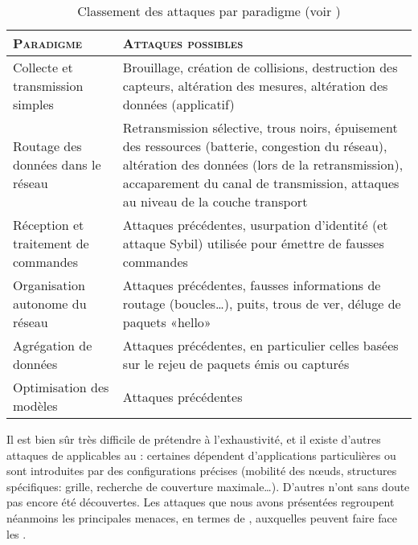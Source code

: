 \begin{table}[!ht]
    \caption{Classement des attaques par paradigme (voir )}\label{ea:tab:paradigm}
    \centering
    \medskip
    \begin{small}
        \begin{tabu}{X[1,l,m]|X[2,j,m]}
            \toprule
            \textsc{Paradigme} & \textsc{Attaques possibles}\\
            \midrule
            Collecte et transmission simples & Brouillage, création de collisions, destruction des capteurs, altération des mesures, altération des données (applicatif)\\
            \midrule
            Routage des données dans le réseau & Retransmission sélective, trous noirs, épuisement des ressources (batterie, congestion du réseau), altération des données (lors de la retransmission), accaparement du canal de transmission, attaques au niveau de la couche transport\\
            \midrule
            Réception et traitement de commandes & Attaques précédentes, usurpation d'identité (et attaque Sybil) utilisée pour émettre de fausses commandes\\
            \midrule
            Organisation autonome du réseau & Attaques précédentes, fausses informations de routage (boucles\dots), puits, trous de ver, déluge de paquets «hello»\\
            \midrule
            Agrégation de données & Attaques précédentes, en particulier celles basées sur le rejeu de paquets émis ou capturés\\
            \midrule
            Optimisation des modèles & Attaques précédentes\\
            \bottomrule
         \end{tabu}
     \end{small}
\end{table}

Il est bien sûr très difficile de prétendre à l'exhaustivité, et il existe d'autres attaques de \dds applicables au \rcs: certaines dépendent d'applications particulières ou sont introduites par des configurations précises (mobilité des nœuds, structures spécifiques: grille, recherche de couverture maximale\dots).
D'autres n'ont sans doute pas encore été découvertes.
Les attaques que nous avons présentées regroupent néanmoins les principales menaces, en termes de \dds, auxquelles peuvent faire face les \rcs.

